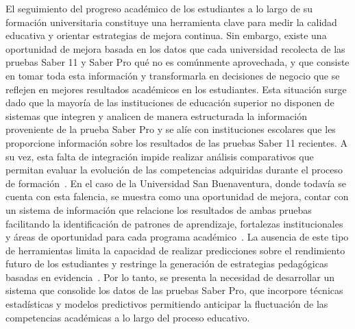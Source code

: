 El seguimiento del progreso académico de los estudiantes a lo largo de su formación universitaria constituye una herramienta clave para medir la calidad educativa y orientar estrategias de mejora continua. Sin embargo, existe una oportunidad de mejora basada en los datos que cada universidad recolecta de las pruebas Saber 11 y Saber Pro qué no es comúnmente aprovechada, y que consiste en tomar toda esta información y transformarla en decisiones de negocio que se reflejen en mejores resultados académicos en los estudiantes.
Esta situación surge dado que la mayoría de las instituciones de educación superior no disponen de sistemas que integren y analicen de manera estructurada la información proveniente de la prueba Saber Pro y se alíe con instituciones escolares que les proporcione información sobre los resultados de las pruebas Saber 11 recientes. A su vez, esta falta de integración impide realizar análisis comparativos que permitan evaluar la evolución de las competencias adquiridas durante el proceso de formación~\cite{garcia2021pruebas}.
En el caso de la Universidad San Buenaventura, donde todavía se cuenta con esta falencia, se muestra como una oportunidad de mejora, contar con un sistema de información que relacione los resultados de ambas pruebas facilitando la identificación de patrones de aprendizaje, fortalezas institucionales y áreas de oportunidad para cada programa académico~\cite{mendieta2024modelo}. La ausencia de este tipo de herramientas limita la capacidad de realizar predicciones sobre el rendimiento futuro de los estudiantes y restringe la generación de estrategias pedagógicas basadas en evidencia~\cite{icfes2024_informeSaber11_2023}.
Por lo tanto, se presenta la necesidad de desarrollar un sistema que consolide los datos de las pruebas Saber Pro, que incorpore técnicas estadísticas y modelos predictivos permitiendo anticipar la fluctuación de las competencias académicas a lo largo del proceso educativo.


